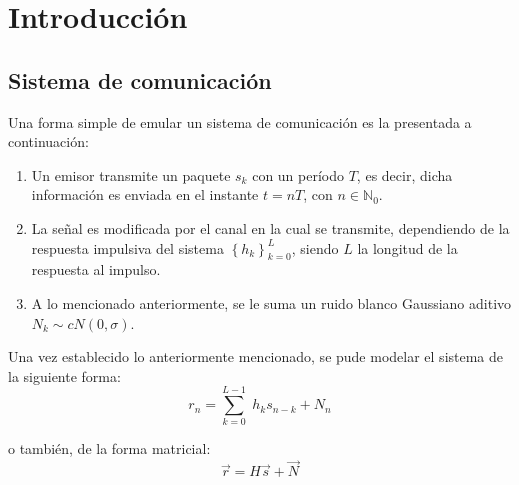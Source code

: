 \documentclass[a4paper]{article}
\begin{document}





\section{Introducción}
	 \subsection{Sistema de comunicación}
	 	Una forma simple de emular un sistema de comunicación es la presentada a continuación:
	 	\begin{enumerate}
	 		\item	Un emisor transmite un paquete $ s_k $ con un período $ T $, es decir, dicha información es enviada en el instante $ t = nT $, con $ n \in \mathbb{N}_0 $.
	 		\item	La señal es modificada por el canal en la cual se transmite, dependiendo de la respuesta impulsiva del sistema $ {\left \lbrace h_k \right \rbrace}_{k=0}^{L}  $, siendo $ L $ la longitud de la respuesta al impulso.
	 		\item	A lo mencionado anteriormente, se le suma un ruido blanco Gaussiano aditivo $ N_{k}  \sim cN(0,\sigma) $.
 	 	\end{enumerate}
 	 	
 	 	Una vez establecido lo anteriormente mencionado, se pude modelar el sistema de la siguiente forma:
 	 	\begin{equation}
			r_{n} = \sum_{k=0}^{L-1} \; h_{k}s_{n-k} + N_{n}	
 	 	\end{equation}
 	 	
 	 	o también, de la forma matricial:
 	 	\begin{equation}
 	 		\vec{r} = H\vec{s} + \vec{N}
 	 	\end{equation}
 	 	
\end{document}
